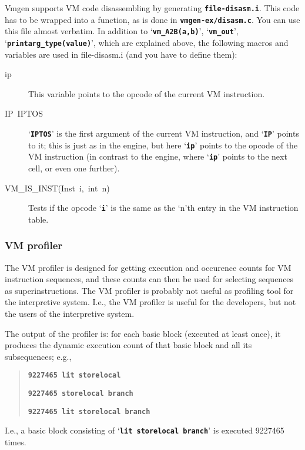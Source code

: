 \documentclass[10pt,english]{article}
\begin{document}
Vmgen supports VM code disassembling by generating \texttt{\textbf{file-disasm.i}}.
This code has to be wrapped into a function, as is done in \texttt{\textbf{vmgen-ex/disasm.c}}.
You can use this file almost verbatim. In addition to \textquoteleft{}\texttt{\textbf{vm\_A2B(a,b)}}\textquoteright{},
\textquoteleft{}\texttt{\textbf{vm\_out}}\textquoteright{}, \textquoteleft{}\texttt{\textbf{printarg\_type(value)}}\textquoteright{},
which are explained above, the following macros and variables are
used in file-disasm.i (and you have to define them):
\begin{description}
\item [{ip}] This variable points to the opcode of the current VM instruction.
\item [{IP~IPTOS}] \textquoteleft{}\texttt{\textbf{IPTOS}}\textquoteright{}
is the first argument of the current VM instruction, and \textquoteleft{}\texttt{\textbf{IP}}\textquoteright{}
points to it; this is just as in the engine, but here \textquoteleft{}\texttt{\textbf{ip}}\textquoteright{}
points to the opcode of the VM instruction (in contrast to the engine,
where \textquoteleft{}\texttt{\textbf{ip}}\textquoteright{} points
to the next cell, or even one further).
\item [{VM\_IS\_INST(Inst~i,~int~n)}] Tests if the opcode \textquoteleft{}\texttt{\textbf{i}}\textquoteright{}
is the same as the \textquoteleft{}n\textquoteright{}th entry in the
VM instruction table.
\end{description}

\subsubsection{VM profiler\label{sub:VM-profiler}}

The VM profiler is designed for getting execution and occurence counts
for VM instruction sequences, and these counts can then be used for
selecting sequences as superinstructions. The VM profiler is probably
not useful as profiling tool for the interpretive system. I.e., the
VM profiler is useful for the developers, but not the users of the
interpretive system.

The output of the profiler is: for each basic block (executed at least
once), it produces the dynamic execution count of that basic block
and all its subsequences; e.g.,
\begin{quotation}
\texttt{\textbf{9227465 lit storelocal}}

\texttt{\textbf{9227465 storelocal branch}}

\texttt{\textbf{9227465 lit storelocal branch}}
\end{quotation}
I.e., a basic block consisting of \textquoteleft{}\texttt{\textbf{lit
storelocal branch}}\textquoteright{} is executed 9227465 times.
\end{document}
